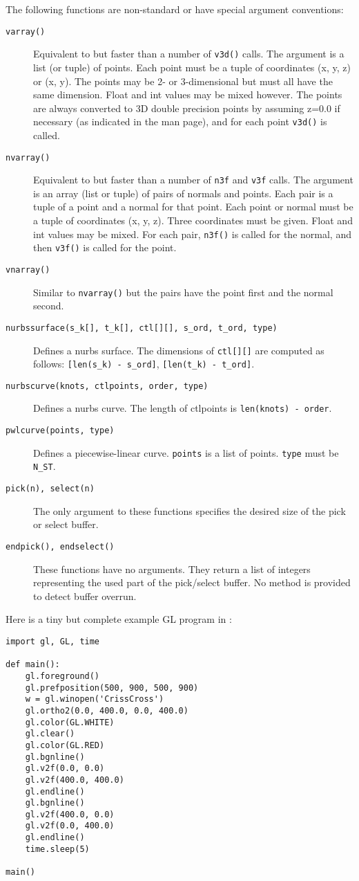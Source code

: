 The following functions are non-standard or have special argument
conventions:
\begin{description}
\item[{\tt varray()}]
Equivalent to but faster than a number of
{\tt v3d()}
calls.
The argument is a list (or tuple) of points.
Each point must be a tuple of coordinates (x, y, z) or (x, y).
The points may be 2- or 3-dimensional but must all have the
same dimension.
Float and int values may be mixed however.
The points are always converted to 3D double precision points
by assuming z=0.0 if necessary (as indicated in the man page),
and for each point
{\tt v3d()}
is called.
\item[{\tt nvarray()}]
Equivalent to but faster than a number of
{\tt n3f}
and
{\tt v3f}
calls.
The argument is an array (list or tuple) of pairs of normals and points.
Each pair is a tuple of a point and a normal for that point.
Each point or normal must be a tuple of coordinates (x, y, z).
Three coordinates must be given.
Float and int values may be mixed.
For each pair,
{\tt n3f()}
is called for the normal, and then
{\tt v3f()}
is called for the point.
\item[{\tt vnarray()}]
Similar to 
{\tt nvarray()}
but the pairs have the point first and the normal second.
\item[{\tt nurbssurface(s\_k[], t\_k[], ctl[][], s\_ord, t\_ord, type)}]
Defines a nurbs surface.
The dimensions of
{\tt ctl[][]}
are computed as follows:
{\tt [len(s\_k)~-~s\_ord]},
{\tt [len(t\_k)~-~t\_ord]}.
\item[{\tt nurbscurve(knots, ctlpoints, order, type)}]
Defines a nurbs curve.
The length of ctlpoints is
{\tt len(knots)~-~order}.
\item[{\tt pwlcurve(points, type)}]
Defines a piecewise-linear curve.
{\tt points}
is a list of points.
{\tt type}
must be
{\tt N\_ST}.
\item[{\tt pick(n), select(n)}]
The only argument to these functions specifies the desired size of the
pick or select buffer.
\item[{\tt endpick(), endselect()}]
These functions have no arguments.
They return a list of integers representing the used part of the
pick/select buffer.
No method is provided to detect buffer overrun.
\end{description}

Here is a tiny but complete example GL program in {\Python}:
\begin{code}\begin{verbatim}
import gl, GL, time

def main():
    gl.foreground()
    gl.prefposition(500, 900, 500, 900)
    w = gl.winopen('CrissCross')
    gl.ortho2(0.0, 400.0, 0.0, 400.0)
    gl.color(GL.WHITE)
    gl.clear()
    gl.color(GL.RED)
    gl.bgnline()
    gl.v2f(0.0, 0.0)
    gl.v2f(400.0, 400.0)
    gl.endline()
    gl.bgnline()
    gl.v2f(400.0, 0.0)
    gl.v2f(0.0, 400.0)
    gl.endline()
    time.sleep(5)

main()
\end{verbatim}\end{code}

